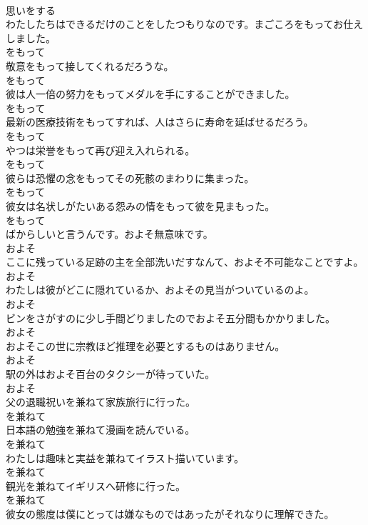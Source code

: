 \documentclass[8pt]{extreport}
\begin{document}
\begin{CJK}{UTF8}{min}
\\	思いをする	
\\	わたしたちはできるだけのことをしたつもりなのです。まごころをもってお仕えしました。	
\\	をもって	
\\	敬意をもって接してくれるだろうな。	
\\	をもって	
\\	彼は人一倍の努力をもってメダルを手にすることができました。	
\\	をもって	
\\	最新の医療技術をもってすれば、人はさらに寿命を延ばせるだろう。	
\\	をもって	
\\	やつは栄誉をもって再び迎え入れられる。	
\\	をもって	
\\	彼らは恐懼の念をもってその死骸のまわりに集まった。	
\\	をもって	
\\	彼女は名状しがたいある怨みの情をもって彼を見まもった。	
\\	をもって	
\\	ばからしいと言うんです。およそ無意味です。	
\\	およそ	
\\	ここに残っている足跡の主を全部洗いだすなんて、およそ不可能なことですよ。	
\\	およそ	
\\	わたしは彼がどこに隠れているか、およその見当がついているのよ。	
\\	およそ	
\\	ビンをさがすのに少し手間どりましたのでおよそ五分間もかかりました。	
\\	およそ	
\\	およそこの世に宗教ほど推理を必要とするものはありません。	
\\	およそ	
\\	駅の外はおよそ百台のタクシーが待っていた。	
\\	およそ	
\\	父の退職祝いを兼ねて家族旅行に行った。	
\\	を兼ねて	
\\	日本語の勉強を兼ねて漫画を読んでいる。	
\\	を兼ねて	
\\	わたしは趣味と実益を兼ねてイラスト描いています。	
\\	を兼ねて	
\\	観光を兼ねてイギリスへ研修に行った。	
\\	を兼ねて	
\\	彼女の態度は僕にとっては嫌なものではあったがそれなりに理解できた。	

\end{CJK}
\end{document}
